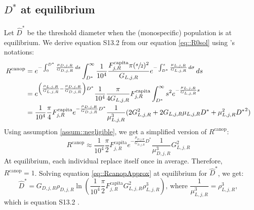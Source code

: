 \begin{refsection}
\subsection{$ D^{*} $ at equilibrium \citep[equation S13.2]{Purves2009}}
Let $ \hat D^{*} $ be the threshold diameter when the (monospecific) population is at equilibrium. We derive equation S13.2 \citep{Purves2009} from our equation \eqref{eq::R0sol} using \citeauthor{Purves2009}'s notations:
\begin{align*}
	R^{\text{canop}} &= e^{-\int_{0}^{D^{*}} \frac{\mu_{D, j, R}}{G_{D, j, R}} \, ds} \int_{D^{*}}^{\infty} \frac{1}{10^4} \frac{F_{j, R}^{\text{capita}} \pi (\sfrac{s}{2})^2}{G_{L, j, R}} e^{-\int_{D^{*}}^{s} \frac{\mu_{L, j, R}}{G_{L, j, R}} \, d\sigma} \, ds \\
		&= e^{\left(\frac{\mu_{L, j, R}}{G_{L, j, R}} - \frac{\mu_{D, j, R}}{G_{D, j, R}} \right) D^{*}} \frac{1}{10^4} \frac{\pi}{4 G_{L, j, R}} F_{j, R}^{\text{capita}} \int_{D^{*}}^{\infty} s^2 e^{-\frac{\mu_{L, j, R}}{G_{L, j, R}} s} \\
		&= \frac{1}{10^4} \frac{\pi}{4} F_{j, R}^{\text{capita}} e^{- \frac{\mu_{D, j, R}}{G_{D, j, R}} D^{*}} \frac{1}{\mu_{L, j, R}^3} (2 G_{L, j, R}^2 + 2 G_{L, j, R} \mu_{L, j, R} D^{*} + \mu_{L, j, R}^2 {D^{*}}^2)
\end{align*}
Using assumption \ref{assum::negligible}, we get a simplified version of $ R^{\text{canop}} $:
\begin{equation} \label{eq::RcanopApprox}
	R^{\text{canop}} \approx \frac{1}{10^4} \frac{\pi}{2} F_{j, R}^{\text{capita}} e^{- \frac{\mu_{D, j, R}}{G_{D, j, R}} D^{*}} \frac{1}{\mu_{D, j, R}^3} G_{L, j, R}^2
\end{equation}
At equilibrium, each individual replace itself once in average. Therefore, $ R^{\text{canop}} = 1 $. Solving equation \eqref{eq::RcanopApprox} at equilibrium for $ \hat D^{*} $, we get:
\[
	\hat D^{*} = G_{D, j, R} \rho_{D, j, R} \ln \left( \frac{1}{10^4} \frac{\pi}{2} F_{j, R}^{\text{capita}} G_{L, j, R}^2 \rho_{L, j, R}^3 \right) \text{, where } \frac{1}{\mu_{L, j, R}^3} = \rho_{L, j, R}^3,
\]
which is equation S13.2 \citep{Purves2009}.


\end{refsection}

